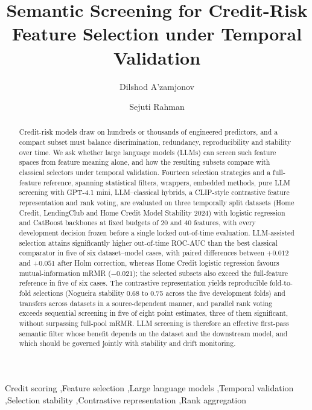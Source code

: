 \documentclass[final,5p,twocolumn]{elsarticle}
\begin{document}
\begin{frontmatter}

\title{Semantic Screening for Credit-Risk Feature Selection under Temporal Validation}

\author[aff1]{Dilshod A'zamjonov}

\author[aff2]{Sejuti Rahman}


\address[aff1]{Department of Engineering, New Uzbekistan University, 1 Movarounnahr Street, Mirzo Ulugbek District, Tashkent, Uzbekistan}
\address[aff2]{Department of Computing, New Uzbekistan University, 1 Movarounnahr Street, Mirzo Ulugbek District, Tashkent, Uzbekistan}

\begin{abstract}
Credit-risk models draw on hundreds or thousands of engineered predictors, and a compact subset must balance discrimination, redundancy, reproducibility and stability over time. We ask whether large language models (LLMs) can screen such feature spaces from feature meaning alone, and how the resulting subsets compare with classical selectors under temporal validation. Fourteen selection strategies and a full-feature reference, spanning statistical filters, wrappers, embedded methods, pure LLM screening with GPT-4.1 mini, LLM--classical hybrids, a CLIP-style contrastive feature representation and rank voting, are evaluated on three temporally split datasets (Home Credit, LendingClub and Home Credit Model Stability 2024) with logistic regression and CatBoost backbones at fixed budgets of 20 and 40 features, with every development decision frozen before a single locked out-of-time evaluation. LLM-assisted selection attains significantly higher out-of-time ROC-AUC than the best classical comparator in five of six dataset--model cases, with paired differences between $+0.012$ and $+0.051$ after Holm correction, whereas Home Credit logistic regression favours mutual-information mRMR ($-0.021$); the selected subsets also exceed the full-feature reference in five of six cases. The contrastive representation yields reproducible fold-to-fold selections (Nogueira stability 0.68 to 0.75 across the five development folds) and transfers across datasets in a source-dependent manner, and parallel rank voting exceeds sequential screening in five of eight point estimates, three of them significant, without surpassing full-pool mRMR. LLM screening is therefore an effective first-pass semantic filter whose benefit depends on the dataset and the downstream model, and which should be governed jointly with stability and drift monitoring.
\end{abstract}

\begin{keyword}
Credit scoring \sep Feature selection \sep Large language models \sep Temporal validation \sep Selection stability \sep Contrastive representation \sep Rank aggregation
\end{keyword}

\end{frontmatter}
\end{document}
